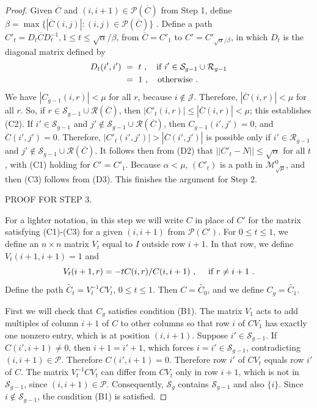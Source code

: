 \documentclass{amsart}
\theoremstyle{definition}
\theoremstyle{remark}
\numberwithin{equation}{section}
\begin{document}
{{\begin{proof}
Given $\overline C$ and $(i,i+1)\in \mathcal P(\overline C)$ 
from Step 1, define 
$\beta = 
 \max \{|\overline C(i,j)|: (i,j)\in \mathcal P(\overline C)\}$ . 
Define a path
$C'_t=D_t\overline{C}D_t^{-1}, 1\leq t \leq \sqrt{\alpha}/\beta$, 
 from $\overline C=C'_1$ to $C'=
 C'_{\sqrt{\alpha}/\beta}$,   
in which $D_t$ is the diagonal matrix defined by 
\begin{align*} 
D_t(i',i') \  & = \ t \ , \quad 
\textnormal{if } i'\in \mathcal S_{g-1}\cup \mathcal R_{g-1} \\ 
& = \  1 \ , \quad 
\textnormal{otherwise .} 
\end{align*} 
We have $|C_{g-1}(i,r)|<\mu$ 
for all $r$, 
because $i\notin \mathcal J$.  
 Therefore, $|\overline C(i,r)|<\mu$ 
for all $r$.  
So, if 
 $r\in \mathcal S_{g-1}\cup \mathcal R(\overline C)$, then 
$|C'_t(i,r)|\leq |\overline C(i,r)|< \mu$; this establishes 
(C2). 
If $i'\in 
\mathcal S_{g-1}$ and 
$j'\notin 
\mathcal S_{g-1}\cup \mathcal R(\overline C)$,
then  $C_{g-1}(i',j') =0$, and $\overline C(i',j')=0$. 
Therefore,  
$|C'_t(i',j')|> |\overline C(i',j')|$ is possible 
only if 
$i'\in \mathcal R_{g-1}$ 
and $j'\notin \mathcal S_{g-1}\cup \mathcal R(\overline C)$. 
It follows then from (D2) that 
$||C'_t-N||\leq \sqrt{\alpha} $ for all $t$, 
with (C1) holding for $C'=C'_1$. Because $\alpha < \mu$, 
$(C'_t)$ is a path in $\mathcal M^0_{\sqrt{\mu}}$, and 
then (C3) follows from (D3). 
This  
 finishes the argument for Step 2.  

PROOF FOR STEP 3. 

For a lighter notation, in this step we will write $C$ in place 
of $C'$ for the matrix satisfying (C1)-(C3) for a given 
$(i,i+1)$ from $ \mathcal P( C')$.  
For $0\leq t\leq 1$, we define an $n\times n$ matrix 
$V_t$ equal to $I$ outside row $i+1$. In that row, 
we define $V_t(i+1,i+1)=1$ and  
\[
V_t(i+1,r)  = -tC(i,r)/C(i,i+1) \ , \quad  
\textnormal{ if } r \neq i+1\ . 
\] 
Define the path $\widetilde{C_t}=V_t^{-1}CV_t$, $0\leq t \leq 1$. 
Then $C=\widetilde{C_0}$,   and we define 
$C_g=\widetilde{C_1}$. 

First we will check that $C_g$ satisfies condition (B1). 
The matrix  $V_1$ acts to add multiples of column $i+1 $ of $C $ to other columns so that 
row $i$ 
of $CV_1$ 
has exactly one 
nonzero entry, which 
 is at position $(i,i+1)$. 
Suppose 
 $i'\in \mathcal S_{g-1}$. If  $C(i',i+1) \neq 0$, 
then $i+1=i'+1$, which forces $i=i'\in \mathcal S_{g-1}$, 
contradicting $(i,i+1)\in \mathcal P$. Therefore  $C(i',i+1) = 0$. 
Therefore  
row $i'$ of $CV_t$ equals row $i'$ of $C$.  
 The matrix 
$V_t^{-1}CV_t$ can differ from $CV_t$ only in row $i+1$, which 
 is not in 
$\mathcal S_{g-1}$, since $(i,i+1)\in \mathcal P$.   Consequently,
 $ \mathcal S_g$ contains $ \mathcal S_{g-1}$ and also $\{i\}$.   Since 
 $i\notin \mathcal S_{g-1}$, 
the condition (B1) is satisfied. 



\end{proof}}}
\end{document}
